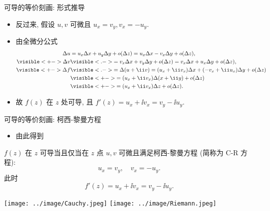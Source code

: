 \begin{frame}{可导的等价刻画: 形式推导}
	\begin{itemize}
		\item 反过来, 假设 \alert{$u,v$ 可微且 $u_x=v_y, v_x=-u_y$}.
		\item 由全微分公式
		\begin{align*}
			\Delta u&=u_x\Delta x+u_y\Delta y+o(\Delta z)
				=u_x\Delta x-v_x\Delta y+o(\Delta z),\\
				\visible<+->{\Delta v}&\visible<.->{=v_x\Delta x+v_y\Delta y+o(\Delta z)
				=v_x\Delta x+u_x\Delta y+o(\Delta z),}\\
			\visible<+->{\Delta f}&
			\visible<.->{=\Delta (u+\ii v)=(u_x+\ii v_x)\Delta x+(-v_x+\ii u_x)\Delta y}+o(\Delta z)\\
			&\visible<+->{=(u_x+\ii v_x)\Delta(x+\ii y)+o(\Delta z)}\\
			&\visible<+->{=(u_x+\ii v_x)\Delta z+o(\Delta z).}
		\end{align*}
		\item 故 \alert{$f(z)$ 在 $z$ 处可导, 且 $f'(z)=u_x+\ii v_x=v_y-\ii u_y$}.
	\end{itemize}
\end{frame}


\begin{frame}{可导的等价刻画: 柯西-黎曼方程}
	\begin{itemize}
		\item 由此得到
	\end{itemize}
	\onslide<+->
	\begin{theorem*}[][柯西-黎曼定理]
		$f(z)$ 在 $z$ 可导当且仅当\alert{在 $z$ 点 $u,v$ 可微}且满足\alert{柯西-黎曼方程} (简称为 C-R 方程):
		\[
			u_x=v_y,\quad v_x=-u_y.
		\]
		此时
		\[
			f'(z)=u_x+\ii v_x=v_y-\ii u_y.
		\]
	\end{theorem*}
	\onslide<+->
	\begin{center}
		\texttt{[image: ../image/Cauchy.jpeg]}
		\hspace{2cm}
		\texttt{[image: ../image/Riemann.jpeg]}
	\end{center}
\end{frame}


